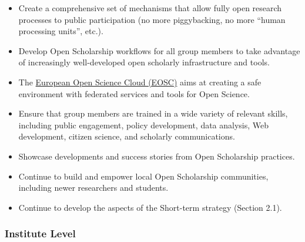\begin{itemize}
\item
  Create a comprehensive set of mechanisms that allow fully open
  research processes to public participation (no more piggybacking, no
  more ``human processing units'', etc.).
\item
  Develop Open Scholarship workflows for all group members to take
  advantage of increasingly well-developed open scholarly infrastructure
  and tools.
\item
  The
  \href{https://ec.europa.eu/research/openscience/index.cfm?pg=open-science-cloud}{European
  Open Science Cloud (EOSC)} aims at creating a safe environment with
  federated services and tools for Open Science.
\item
  Ensure that group members are trained in a wide variety of relevant
  skills, including public engagement, policy development, data
  analysis, Web development, citizen science, and scholarly
  communications.
\item
  Showcase developments and success stories from Open Scholarship
  practices.
\item
  Continue to build and empower local Open Scholarship communities,
  including newer researchers and students.
\item
  Continue to develop the aspects of the Short-term strategy (Section
  2.1).
\end{itemize}

\subsubsection{Institute Level}\label{institute-level}

